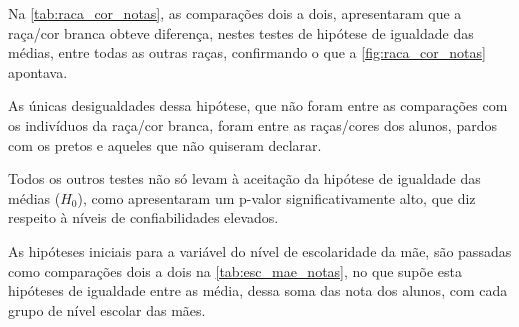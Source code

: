 Na \autoref{tab:raca_cor_notas}, as comparações dois a dois, apresentaram que a raça/cor branca obteve diferença,
nestes testes de hipótese de igualdade das médias, entre todas as outras raças, confirmando o que a 
\autoref{fig:raca_cor_notas} apontava.

As únicas desigualdades dessa hipótese, que não foram entre as comparações com os indivíduos da raça/cor branca,
foram entre as raças/cores dos alunos, pardos com os pretos e aqueles que não quiseram declarar.

Todos os outros testes não só levam à aceitação da hipótese de igualdade das médias ($H_0$), como apresentaram um p-valor
significativamente alto, que diz respeito à níveis de confiabilidades elevados.


As hipóteses iniciais para a variável do nível de escolaridade da mãe, são passadas como comparações dois a dois na \autoref{tab:esc_mae_notas},
no que supõe esta hipóteses de igualdade entre as média, dessa soma das nota dos alunos, com cada grupo de nível escolar das mães.
\newpage

